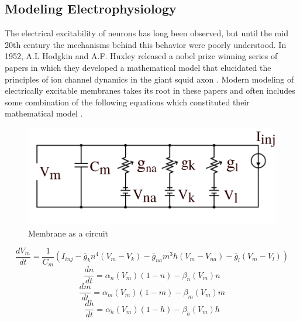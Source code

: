 \subsection{Modeling Electrophysiology}
The electrical excitability of neurons has long been observed, but until the mid 20th century the mechanisms behind this behavior were poorly understood. In 1952, A.L Hodgkin and A.F. Huxley released a nobel prize winning series of papers in which they developed a mathematical model that elucidated the principles of ion channel dynamics in the giant squid axon \cite{hodgkin_effect_1949}. Modern modeling of electrically excitable membranes takes its root in these papers and often includes some combination of the following equations which constituted their mathematical model \cite{riz_mathematical_2014}.
\begin{figure}[h!]\label{circ}
	\centering
	\includegraphics[scale=0.65]{Figures/circuit_labeled.png}
	\caption{Membrane as a circuit}
\end{figure}
\begin{equation}\label{hh}
\frac{dV_m}{dt} = \frac{1}{C_m} (I_{inj} - \bar{g}_k n^4 (V_m - V_k) -\bar{g}_{na} m^3 h (V_m - V_{na}) - \bar{g}_l (V_m - V_l))
\end{equation}
\begin{equation}\label{dn}
\frac{dn}{dt} = \alpha_n (V_m) (1 - n) - \beta_n (V_m) n
\end{equation}
\begin{equation}\label{dm}
\frac{dm}{dt} = \alpha_m (V_m) (1 - m) - \beta_m (V_m) m
\end{equation}
\begin{equation}\label{dh}
\frac{dh}{dt} = \alpha_h (V_m) (1 - h) - \beta_h (V_m) h
\end{equation}

